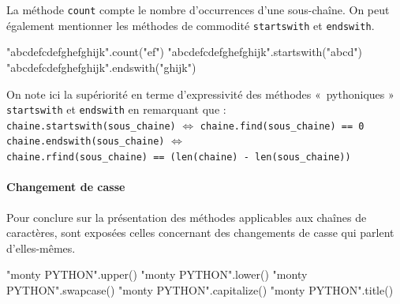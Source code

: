 La méthode \texttt{count} compte le nombre d'occurrences d'une sous-chaîne. On peut également mentionner les méthodes de commodité \texttt{startswith} et \texttt{endswith}.

\begin{idleconsole}
	\begin{pyconsole}
		"abcdefcdefghefghijk".count("ef")
		"abcdefcdefghefghijk".startswith("abcd")
		"abcdefcdefghefghijk".endswith("ghijk")
\end{pyconsole}
\end{idleconsole}

On note ici la supériorité en terme d'expressivité des méthodes «~pythoniques » \texttt{startswith} et \texttt{endswith} en remarquant que :\\[2pt]
\texttt{chaine.startswith(sous\_chaine)} $\Leftrightarrow$ \texttt{chaine.find(sous\_chaine) == 0}\\[2pt]
\texttt{chaine.endswith(sous\_chaine)} $\Leftrightarrow$\\ \texttt{chaine.rfind(sous\_chaine) == (len(chaine) - len(sous\_chaine))}

\paragraph{Changement de casse}
Pour conclure sur la présentation des méthodes applicables aux chaînes de caractères, sont exposées celles concernant des changements de casse qui parlent d'elles-mêmes.

\begin{idleconsole}
	\begin{pyconsole}
		"monty PYTHON".upper()
		"monty PYTHON".lower()
		"monty PYTHON".swapcase()
		"monty PYTHON".capitalize()
		"monty PYTHON".title()
\end{pyconsole}
\end{idleconsole}

\vspace{1pt}


